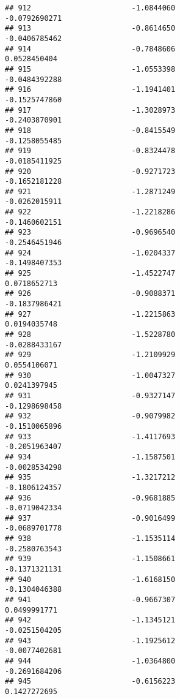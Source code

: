 \documentclass[
]{article}
\begin{document}
\begin{verbatim}
## 912                       -1.0844060                         -0.0792690271
## 913                       -0.8614650                         -0.0406785462
## 914                       -0.7848606                          0.0528450404
## 915                       -1.0553398                         -0.0484392288
## 916                       -1.1941401                         -0.1525747860
## 917                       -1.3028973                         -0.2403870901
## 918                       -0.8415549                         -0.1258055485
## 919                       -0.8324478                         -0.0185411925
## 920                       -0.9271723                         -0.1652181228
## 921                       -1.2871249                         -0.0262015911
## 922                       -1.2218286                         -0.1460602151
## 923                       -0.9696540                         -0.2546451946
## 924                       -1.0204337                         -0.1498407353
## 925                       -1.4522747                          0.0718652713
## 926                       -0.9088371                         -0.1837986421
## 927                       -1.2215863                          0.0194035748
## 928                       -1.5228780                         -0.0288433167
## 929                       -1.2109929                          0.0554106071
## 930                       -1.0047327                          0.0241397945
## 931                       -0.9327147                         -0.1298698458
## 932                       -0.9079982                         -0.1510065896
## 933                       -1.4117693                         -0.2051963407
## 934                       -1.1587501                         -0.0028534298
## 935                       -1.3217212                         -0.1806124357
## 936                       -0.9681885                         -0.0719042334
## 937                       -0.9016499                         -0.0689701778
## 938                       -1.1535114                         -0.2580763543
## 939                       -1.1508661                         -0.1371321131
## 940                       -1.6168150                         -0.1304046388
## 941                       -0.9667307                          0.0499991771
## 942                       -1.1345121                         -0.0251504205
## 943                       -1.1925612                         -0.0077402681
## 944                       -1.0364800                         -0.2691684206
## 945                       -0.6156223                          0.1427272695

\end{verbatim}
\end{document}
